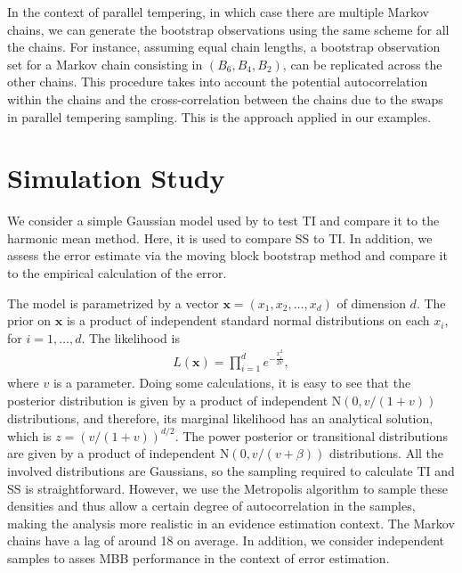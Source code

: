 \documentclass[aps,reprint,amsmath,amssymb,showpacs,showkeys]{revtex4-1}%
\begin{document}
In the context of parallel tempering, in which case there are multiple Markov chains, we can generate the bootstrap observations using the same scheme for all the chains.  For instance, assuming equal chain lengths, a bootstrap observation set for a Markov chain consisting in $(B_6,B_4,B_2)$, can be replicated across the other chains.  This procedure takes into account the potential autocorrelation within the chains and the cross-correlation between the chains due to the swaps in parallel tempering sampling.  This is the approach applied in our examples.

\section{Simulation Study} \label{sec:simulation}
We consider a simple Gaussian model used by \cite{Lartillot:Philippe:2006} to test TI and compare it to the harmonic mean method.  Here, it is used to compare SS to TI.  In  addition, we assess the error estimate via the moving block bootstrap method and compare it to the empirical calculation of the error.  

The model is parametrized by a vector $\bm{x} = (x_1,x_2, \dots, x_d)$ of dimension $d$. The prior on $\bm x$ is a product of independent standard normal distributions on each $x_i$, for $i = 1, \dots,d$.  The likelihood is 
\begin{align*}
L(\bm{x}) = \prod_{i=1}^{d} e^{- \frac{x_i^2}{2v}},
\end{align*}
where $v$ is a parameter.  Doing some calculations, it is easy to see that the posterior distribution is given by a product of independent $\text{N}(0, v/(1+v))$ distributions, and therefore, its marginal likelihood has an analytical solution, which is $z = (v/(1+v))^{d/2}$.  The power posterior or transitional distributions are given by a product of independent  $\text{N}(0,v/(v+\beta))$ distributions.  All the involved distributions are Gaussians, so the sampling required to calculate TI and SS is straightforward.  However, we use the Metropolis algorithm to sample these densities and thus allow a certain degree of autocorrelation in the samples, making the analysis more realistic in an evidence estimation context.  The Markov chains have a lag of around 18 on average.  In addition, we consider independent samples to asses MBB performance in the context of error estimation.  
\end{document}

